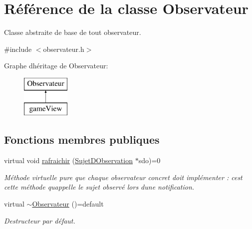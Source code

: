 \hypertarget{class_observateur}{}\section{Référence de la classe Observateur}
\label{class_observateur}


Classe abstraite de base de tout observateur.  




{\ttfamily \#include $<$observateur.\+h$>$}

Graphe d\textquotesingle{}héritage de Observateur\+:\begin{figure}[H]
\begin{center}
\leavevmode
\includegraphics[height=2.000000cm]{class_observateur}
\end{center}
\end{figure}
\subsection*{Fonctions membres publiques}
\begin{DoxyCompactItemize}
\item 
virtual void \mbox{\hyperlink{class_observateur_a4fcbecba73ee923d201246207b8470ce}{rafraichir}} (\mbox{\hyperlink{class_sujet_d_observation}{Sujet\+D\+Observation}} $\ast$sdo)=0
\begin{DoxyCompactList}\small\item\em Méthode virtuelle pure que chaque observateur concret doit implémenter \+: c\textquotesingle{}est cette méthode qu\textquotesingle{}appelle le sujet observé lors d\textquotesingle{}une notification. \end{DoxyCompactList}\item 
\mbox{\label{class_observateur_ac1f97bef4e22594403513069d8269e17}} 
virtual \mbox{\hyperlink{class_observateur_ac1f97bef4e22594403513069d8269e17}{$\sim$\+Observateur}} ()=default
\begin{DoxyCompactList}\small\item\em Destructeur par défaut. \end{DoxyCompactList}\end{DoxyCompactItemize}


